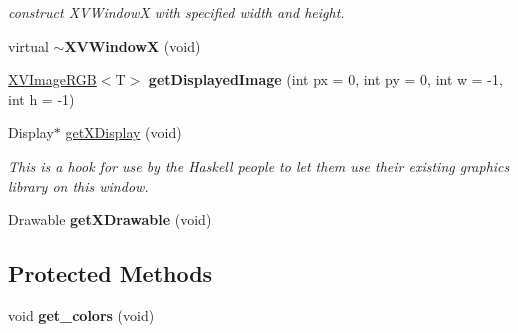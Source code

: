 \begin{CompactItemize}
\begin{CompactList}\small\item\em construct XVWindow\-X with specified width and height.\item\end{CompactList}\item 
\label{XVWindowX_a18}
\hypertarget{class_XVWindowX_a18}{
virtual {\bf $\sim$XVWindow\-X} (void)}

\item 
\label{XVWindowX_a19}
\hypertarget{class_XVWindowX_a19}{
\hyperlink{class_XVImageRGB}{XVImage\-RGB}$<$T$>$ {\bf get\-Displayed\-Image} (int px = 0, int py = 0, int w = -1, int h = -1)}

\item 
Display$\ast$ \hyperlink{class_XVWindowX_a20}{get\-XDisplay} (void)
\begin{CompactList}\small\item\em This is a hook for use by the Haskell people to let them use their existing graphics library on this window.\item\end{CompactList}\item 
Drawable {\bf get\-XDrawable} (void)
\end{CompactItemize}
\subsection*{Protected Methods}
\begin{CompactItemize}
\item 
\label{XVWindowX_b0}
\hypertarget{class_XVWindowX_b0}{
void {\bf get\_\-colors} (void)}

\end{CompactItemize}
